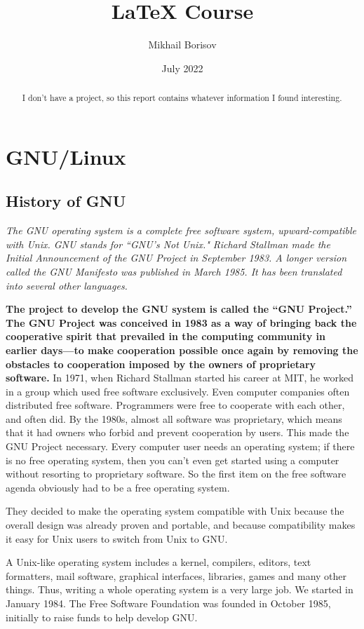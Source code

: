 \documentclass{report}
\title{LaTeX Course}
\author{Mikhail Borisov}
\date{July 2022}
\begin{document}
\maketitle
\begin{abstract}
    I don't have a project, so this report contains whatever information I found interesting.
\end{abstract}

\tableofcontents
\chapter{GNU/Linux}
\section{History of GNU}
\textit{The GNU operating system is a complete free software system, upward-compatible with Unix. GNU stands for ``GNU's Not Unix." Richard Stallman made the Initial Announcement of the GNU Project in September 1983. A longer version called the GNU Manifesto was published in March 1985. It has been translated into several other languages.}

\textbf{The project to develop the GNU system is called the “GNU Project.” The GNU Project was conceived in 1983 as a way of bringing back the cooperative spirit that prevailed in the computing community in earlier days—to make cooperation possible once again by removing the obstacles to cooperation imposed by the owners of proprietary software.}
\tiny
In 1971, when Richard Stallman started his career at MIT, he worked in a group which used free software exclusively. Even computer companies often distributed free software. Programmers were free to cooperate with each other, and often did.
\Huge
By the 1980s, almost all software was proprietary, which means that it had owners who forbid and prevent cooperation by users. This made the GNU Project necessary.
\normalsize
Every computer user needs an operating system; if there is no free operating system, then you can't even get started using a computer without resorting to proprietary software. So the first item on the free software agenda obviously had to be a free operating system.

They decided to make the operating system compatible with Unix because the overall design was already proven and portable, and because compatibility makes it easy for Unix users to switch from Unix to GNU.

A Unix-like operating system includes a kernel, compilers, editors, text formatters, mail software, graphical interfaces, libraries, games and many other things. Thus, writing a whole operating system is a very large job. We started in January 1984. The Free Software Foundation was founded in October 1985, initially to raise funds to help develop GNU.
\end{document}
